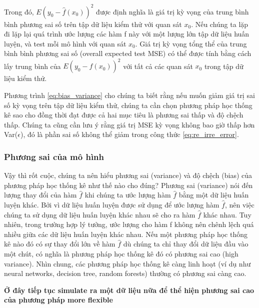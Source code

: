 \documentclass[
]{article}
\begin{document}
Trong đó, \(E\left(y_0 - \hat{f}(x_0)\right)^2\) được định nghĩa là giá trị kỳ vọng của trung bình bình phương sai số trên tập dữ liệu kiểm thử với quan sát \(x_0\). Nếu chúng ta lặp đi lặp lại quá trình ước lượng các hàm f này với một lượng lớn tập dữ liệu huấn luyện, và test mỗi mô hình với quan sát \(x_0\). Giá trị kỳ vọng tổng thể của trung bình bình phương sai số (overall expected test MSE) có thể được tính bằng cách lấy trung bình của \(E\left(y_0 - \hat{f}(x_0)\right)^2\) với tất cả các quan sát \(x_0\) trong tập dữ liệu kiểm thử.

Phương trình \ref{eq:bias_variance} cho chúng ta biết rằng nếu muốn giảm giá trị sai số kỳ vọng trên tập dữ liệu kiểm thử, chúng ta cần chọn phương pháp học thống kê sao cho đồng thời đạt được cả hai mục tiêu là phương sai thấp và độ chệch thấp. Chúng ta cũng cần lưu ý rằng giá trị MSE kỳ vọng không bao giờ thấp hơn Var(\(\epsilon\)), đó là phần sai số không thể giảm trong công thức \ref{eq:re_irre_error}.

\hypertarget{phux1b0ux1a1ng-sai-cux1ee7a-muxf4-huxecnh}{%
\subsubsection{Phương sai của mô hình}\label{phux1b0ux1a1ng-sai-cux1ee7a-muxf4-huxecnh}}

Vậy thì rốt cuộc, chúng ta nên hiểu phương sai (variance) và độ chệch (bias) của phương pháp học thống kê như thế nào cho đúng? Phương sai (variance) nói đến lượng thay đổi của hàm \(\hat{f}\) khi chúng ta ước lượng hàm \(\hat{f}\) bằng một dữ liệu huấn luyện khác. Bởi vì dữ liệu huấn luyện được sử dụng để ước lượng hàm \(\hat{f}\), nên việc chúng ta sử dụng dữ liệu huấn luyện khác nhau sẽ cho ra hàm \(\hat{f}\) khác nhau. Tuy nhiên, trong trường hợp lý tưởng, ước lượng cho hàm f không nên chênh lệch quá nhiều giữa các dữ liệu huấn luyện khác nhau. Nếu một phương pháp học thống kê nào đó có sự thay đổi lớn về hàm \(\hat{f}\) dù chúng ta chỉ thay đổi dữ liệu đầu vào một chút, có nghĩa là phương pháp học thống kê đó có phương sai cao (high variance). Nhìn chung, các phương pháp học thống kê càng linh hoạt (ví dụ như neural networks, decision tree, random forests) thường có phương sai càng cao.

\textbf{Ở đây tiếp tục simulate ra một dữ liệu nữa để thể hiện phương sai cao của phương pháp more flexible}
\end{document}
